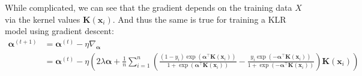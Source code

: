 \documentclass{article}
\renewcommand{\vec}[1]{\mathbf{#1}}
\renewcommand{\grad}[1]{\nabla_{#1}}
\begin{document}
While complicated, we can see that the gradient depends on the training data $X$ via the kernel values $\vec K(\vec x_i)$. And thus the same is true for training a KLR model using gradient descent:
\begin{align*}
  \bm\alpha^{(t+1)}&=\bm\alpha^{(t)}-\eta\grad{\bm\alpha}\\
  &=\bm\alpha^{(t)}-\eta\left(2\lambda\bm\alpha+\frac{1}{n}\sum_{i=1}^n\left(\frac{(1-y_i)\exp(\bm\alpha^\top\vec K(\vec x_i))}{1+\exp(\bm\alpha^\top\vec K(\vec x_i))}-\frac{y_i\exp(-\bm\alpha^\top\vec K(\vec x_i))}{1+\exp(-\bm\alpha^\top\vec K(\vec x_i))}\right)\vec K(\vec x_i)\right)
\end{align*}
\end{document}
